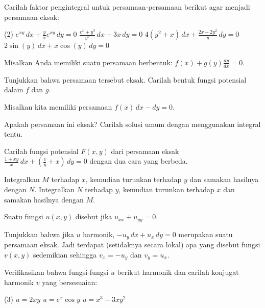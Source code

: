 \begin{exercise}
\pagebreak[2]
Carilah faktor pengintegral untuk persamaan-persamaan berikut agar menjadi
persamaan eksak:
\begin{tasks}(2)
\task
$e^{xy} \, dx + \frac{y}{x} e^{xy} \, dy = 0$
\task
$\frac{e^x+y^3}{y^2} \, dx + 3x \, dy = 0$
\task
$4(y^2+x) \, dx + \frac{2x+2y^2}{y} \, dy = 0$
\task
$2\sin(y) \, dx + x\cos(y)\, dy = 0$
\end{tasks}
\end{exercise}

\begin{exercise}
\pagebreak[2]
Misalkan Anda memiliki suatu persamaan berbentuk:
$f(x) + g(y) \frac{dy}{dx} = 0$.
\begin{tasks}
\task
Tunjukkan bahwa persamaan tersebut eksak.
\task
Carilah bentuk fungsi potensial dalam $f$ dan $g$.
\end{tasks}
\end{exercise}

\begin{exercise}
Misalkan kita memiliki persamaan $f(x) \, dx - dy = 0$.
\begin{tasks}
\task
Apakah persamaan ini eksak?
\task
Carilah solusi umum dengan menggunakan integral tentu.
\end{tasks}
\end{exercise}

\begin{exercise}
Carilah fungsi potensial $F(x,y)$ dari persamaan eksak $\frac{1+xy}{x}\, dx +
\left(\frac{1}{y} + x \right) \, dy = 0$ dengan dua cara yang berbeda.
\begin{tasks}
\task
Integralkan $M$ terhadap $x$, kemudian turunkan terhadap $y$ dan samakan hasilnya dengan
$N$.
\task
Integralkan $N$ terhadap $y$, kemudian turunkan terhadap $x$ dan samakan hasilnya dengan
$M$.
\end{tasks}
\end{exercise}

\begin{samepage}
\begin{exercise}
Suatu fungsi $u(x,y)$ disebut \emph{} jika
$u_{xx} + u_{yy} = 0$.
\begin{tasks}
\task
Tunjukkan bahwa jika $u$ harmonik, $-u_y \, dx + u_x \, dy = 0$ merupakan suatu persamaan
eksak.  Jadi terdapat (setidaknya secara lokal)
apa yang disebut fungsi \emph{}
$v(x,y)$ sedemikian sehingga $v_x = -u_y$ dan $v_y = u_x$.
\end{tasks}
Verifikasikan bahwa fungsi-fungsi $u$ berikut harmonik dan
carilah konjugat harmonik $v$ yang bersesuaian:
\begin{tasks}[resume](3)
\task $u = 2xy$
\task $u = e^x \cos y$
\task $u = x^3-3xy^2$
\end{tasks}
\end{exercise}
\end{samepage}

